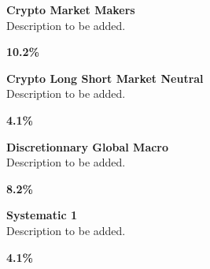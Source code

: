 \documentclass[11pt]{article}
\begin{document}
\begin{tcolorbox}[colback=cardbg, colframe=cardborder, boxrule=0.5pt, arc=4pt, left=6pt, right=6pt, top=6pt, bottom=6pt]
    \begin{minipage}[c]{0.82\linewidth}
        \textbf{\textcolor{primary}{Crypto Market Makers}} \\[4pt]
        \textcolor{primary}{Description to be added.}
    \end{minipage}%
    \hfill
    \begin{minipage}[c]{0.15\linewidth}
        \centering
        \textbf{\Large \textcolor{accent}{10.2\%}}
    \end{minipage}
\end{tcolorbox}

\begin{tcolorbox}[colback=cardbg, colframe=cardborder, boxrule=0.5pt, arc=4pt, left=6pt, right=6pt, top=6pt, bottom=6pt]
    \begin{minipage}[c]{0.82\linewidth}
        \textbf{\textcolor{primary}{Crypto Long Short Market Neutral}} \\[4pt]
        \textcolor{primary}{Description to be added.}
    \end{minipage}%
    \hfill
    \begin{minipage}[c]{0.15\linewidth}
        \centering
        \textbf{\Large \textcolor{accent}{4.1\%}}
    \end{minipage}
\end{tcolorbox}

\begin{tcolorbox}[colback=cardbg, colframe=cardborder, boxrule=0.5pt, arc=4pt, left=6pt, right=6pt, top=6pt, bottom=6pt]
    \begin{minipage}[c]{0.82\linewidth}
        \textbf{\textcolor{primary}{Discretionnary Global Macro}} \\[4pt]
        \textcolor{primary}{Description to be added.}
    \end{minipage}%
    \hfill
    \begin{minipage}[c]{0.15\linewidth}
        \centering
        \textbf{\Large \textcolor{accent}{8.2\%}}
    \end{minipage}
\end{tcolorbox}

\begin{tcolorbox}[colback=cardbg, colframe=cardborder, boxrule=0.5pt, arc=4pt, left=6pt, right=6pt, top=6pt, bottom=6pt]
    \begin{minipage}[c]{0.82\linewidth}
        \textbf{\textcolor{primary}{Systematic 1}} \\[4pt]
        \textcolor{primary}{Description to be added.}
    \end{minipage}%
    \hfill
    \begin{minipage}[c]{0.15\linewidth}
        \centering
        \textbf{\Large \textcolor{accent}{4.1\%}}
    \end{minipage}
\end{tcolorbox}
\end{document}

